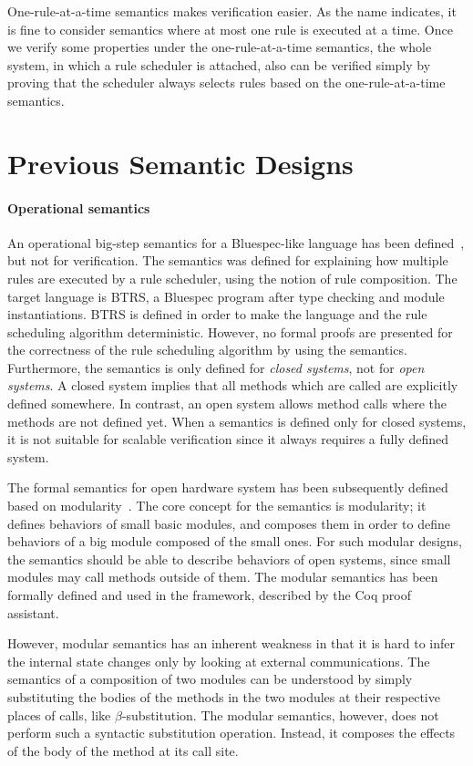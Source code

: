 One-rule-at-a-time semantics makes verification easier. As the name
indicates, it is fine to consider semantics where at most one rule is
executed at a time. Once we verify some properties under the
one-rule-at-a-time semantics, the whole system, in which a rule
scheduler is attached, also can be verified simply by proving that the
scheduler always selects rules based on the one-rule-at-a-time
semantics.

\section{Previous Semantic Designs}
\label{sec:related-works}

\paragraph{Operational semantics}

An operational big-step semantics for a Bluespec-like language has
been defined~\cite{nirav-memocode}, but not for verification. The
semantics was defined for explaining how multiple rules are executed
by a rule scheduler, using the notion of rule composition. The target
language is BTRS, a Bluespec program after type checking and module
instantiations. BTRS is defined in order to make the language and the
rule scheduling algorithm deterministic. However, no formal proofs are
presented for the correctness of the rule scheduling algorithm by
using the semantics. Furthermore, the semantics is only defined for
\emph{closed systems}, not for \emph{open systems}. A closed system
implies that all methods which are called are explicitly defined
somewhere. In contrast, an open system allows method calls where the
methods are not defined yet. When a semantics is defined only for
closed systems, it is not suitable for scalable verification since it
always requires a fully defined system.

The formal semantics for open hardware system has been subsequently
defined based on modularity~\cite{murali-thesis}. The core concept for
the semantics is modularity; it defines behaviors of small basic
modules, and composes them in order to define behaviors of a big
module composed of the small ones. For such modular designs, the
semantics should be able to describe behaviors of open systems, since
small modules may call methods outside of them. The modular semantics
has been formally defined and used in the \Kami{} framework, described
by the Coq proof assistant.

However, modular semantics has an inherent weakness in that it is hard
to infer the internal state changes only by looking at external
communications. The semantics of a composition of two modules can be
understood by simply substituting the bodies of the methods in the two
modules at their respective places of calls, like
$\beta$-substitution. The modular semantics, however, does not perform
such a syntactic substitution operation. Instead, it composes the
effects of the body of the method at its call site.

